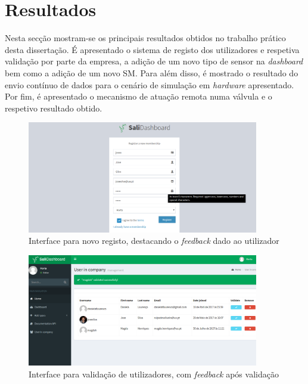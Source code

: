 \section{Resultados}

Nesta secção mostram-se os principais resultados obtidos no trabalho prático desta dissertação. É apresentado o sistema de registo dos utilizadores e respetiva validação por parte da empresa, a adição de um novo tipo de sensor na \textit{dashboard} bem como a adição de um novo \acl{SM}. Para além disso, é mostrado o resultado do envio contínuo de dados para o cenário de simulação em \textit{hardware} apresentado. Por fim, é apresentado o mecanismo de atuação remota numa válvula e o respetivo resultado obtido. 







\newpage


\begin{figure}[h]
	\centering

		\includegraphics[width=0.9\textwidth]{prints-web/register.png}
		\caption{Interface para novo registo, destacando o \textit{feedback} dado ao utilizador}
		\label{novouser}
	
\end{figure}



\begin{figure}[h]
	\centering
		\centering
		\includegraphics[width=0.9\textwidth]{prints-web/validate_company.png}
		\caption{Interface para validação de utilizadores, com \textit{feedback} após validação}
		\label{validateuser}

\end{figure}



